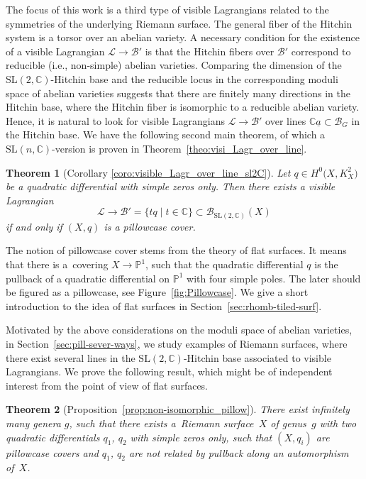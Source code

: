 \documentclass[pdftex]{sigma}
\numberwithin{equation}{section}
\newtheorem{theo}{Theorem}[section]
\theoremstyle{definition}
\renewcommand{\to}{\rightarrow}
\newcommand{\calB}{\mathcal{B}}
\newcommand{\calL}{\mathcal{L}}
\newcommand{\CC}{\mathbb{C}}
\newcommand{\PP}{\mathbb{P}}
\newcommand{\SL}{\mathrm{SL}}
\begin{document}
The focus of this work is a third type of visible Lagrangians related to the symmetries of the underlying Riemann surface. The general fiber of the Hitchin system is a torsor over an abelian variety. A necessary condition for the existence of a visible Lagrangian $\calL \to \calB'$ is that the Hitchin fibers over $\calB'$ correspond to reducible (i.e., non-simple) abelian varieties. Comparing the dimension of the $\SL(2,\CC)$-Hitchin base and the reducible locus in the corresponding moduli space of abelian varieties suggests that there are finitely many directions in the Hitchin base, where the Hitchin fiber is isomorphic to a reducible abelian variety. Hence, it is natural to look for visible Lagrangians $\calL \to \calB'$ over lines $\CC \underline{a} \subset \calB_G$ in the Hitchin base. We have the following second main theorem, of which a $\SL(n,\CC)$-version is proven in Theorem~\ref{theo:visi_Lagr_over_line}.

\begin{theo}[Corollary \ref{coro:visible_Lagr_over_line_sl2C}]\label{theo:intro:1-dim_examples}
 Let $q \in H^0\bigl(X,K_X^2\bigr)$ be a quadratic differential with simple zeros only. Then there exists a visible Lagrangian
 \[ \calL \to \calB'=\{t q \mid t \in \CC\} \subset \calB_{\SL(2,\CC)}(X)
 \]
 if and only if $(X,q)$ is a pillowcase cover.
\end{theo}

The notion of pillowcase cover stems from the theory of flat surfaces. It means that there is a~covering $X \to \PP^1$, such that the quadratic differential $q$ is the pullback of a quadratic differential on $\PP^1$ with four simple poles. The later should be figured as a pillowcase, see Figure~\ref{fig:Pillowcase}. We give a short introduction to the idea of flat surfaces in Section~\ref{sec:rhomb-tiled-surf}.

Motivated by the above considerations on the moduli space of abelian varieties, in Section~\ref{sec:pill-sever-ways}, we study examples of Riemann surfaces, where there exist several lines in the $\SL(2,\CC)$-Hitchin base associated to visible Lagrangians. We prove the following result, which might be of independent interest from the point of view of flat surfaces.

\begin{theo}[{Proposition~\ref{prop:non-isomorphic_pillow}}]\label{theo:intro_3}
 There exist infinitely many genera $g$, such that there exists a~Riemann surface~$X$ of genus~$g$ with two quadratic differentials $q_1$, $q_2$ with simple zeros only, such that $(X,q_i)$ are pillowcase covers and $q_1$, $q_2$ are not related by pullback along an automorphism of~$X$.
\end{theo}
\end{document}
